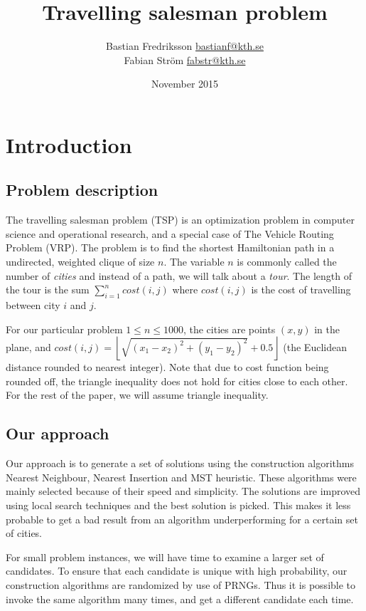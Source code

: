 \documentclass{report}
\title{Travelling salesman problem}
\author{Bastian Fredriksson \href{mailto:bastianf@kth.se}{bastianf@kth.se} \\ 
Fabian Ström \href{mailto:fabstr@kth.se}{fabstr@kth.se}}
\date{November 2015}
\begin{document}
\maketitle

\tableofcontents

\chapter{Introduction}
\section{Problem description}
The travelling salesman problem (TSP) is an optimization problem in computer science and operational research, and a special case of The Vehicle Routing Problem (VRP). The problem is to find the shortest Hamiltonian path in a undirected, weighted clique of size $n$. The variable $n$ is commonly called the number of \textit{cities} and instead of a path, we will talk about a \textit{tour}. The length of the tour is the sum $\sum_{i=1}^n{cost(i, j)}$ where $cost(i, j)$ is the cost of travelling between city $i$ and $j$.

For our particular problem $1 \le n \le 1000$, the cities are points $(x, y)$ in the plane, and $cost(i, j)=\left \lfloor{\sqrt{(x_1-x_2)^2+(y_1-y_2)^2} + 0.5}\right \rfloor$ (the Euclidean distance rounded to nearest integer). Note that due to cost function being rounded off, the triangle inequality does not hold for cities close to each other. For the rest of the paper, we will assume triangle inequality.

\section{Our approach}
Our approach is to generate a set of solutions using the construction algorithms Nearest Neighbour, Nearest Insertion and MST heuristic. These algorithms were mainly selected because of their speed and simplicity. The solutions are improved using local search techniques and the best solution is picked. This makes it less probable to get a bad result from an algorithm underperforming for a certain set of cities.

For small problem instances, we will have time to examine a larger set of candidates. To ensure that each candidate is unique with high probability, our construction algorithms are randomized by use of PRNGs. Thus it is possible to invoke the same algorithm many times, and get a different candidate each time.
\end{document}
